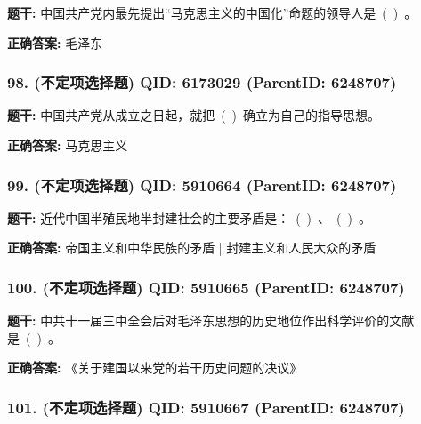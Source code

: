 \documentclass[12pt,UTF8]{ctexart}
\begin{document}
\textbf{题干:}
中国共产党内最先提出“马克思主义的中国化”命题的领导人是 ( ) 。



\textbf{正确答案:}
毛泽东

\vspace{0.3em}\hrulefill\vspace{0.7em}

\subsubsection*{98. (不定项选择题) \small QID: 6173029 (ParentID: 6248707)}

\textbf{题干:}
中国共产党从成立之日起，就把 ( ) 确立为自己的指导思想。



\textbf{正确答案:}
马克思主义

\vspace{0.3em}\hrulefill\vspace{0.7em}

\subsubsection*{99. (不定项选择题) \small QID: 5910664 (ParentID: 6248707)}

\textbf{题干:}
近代中国半殖民地半封建社会的主要矛盾是： ( ) 、 ( ) 。



\textbf{正确答案:}
帝国主义和中华民族的矛盾 | 封建主义和人民大众的矛盾

\vspace{0.3em}\hrulefill\vspace{0.7em}

\subsubsection*{100. (不定项选择题) \small QID: 5910665 (ParentID: 6248707)}

\textbf{题干:}
中共十一届三中全会后对毛泽东思想的历史地位作出科学评价的文献是 ( ) 。



\textbf{正确答案:}
《关于建国以来党的若干历史问题的决议》

\vspace{0.3em}\hrulefill\vspace{0.7em}

\subsubsection*{101. (不定项选择题) \small QID: 5910667 (ParentID: 6248707)}
\end{document}
